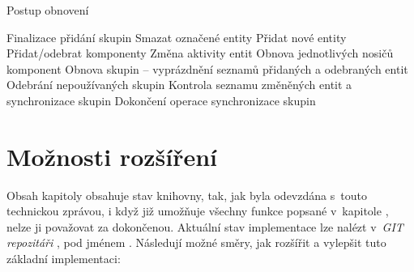 \begin{algorithm}
	\caption{Postup obnovení}
	\label{Alg:Refresh}
	
	\begin{algorithmic}[1]
		
			\EMBlockStart
				\State Finalizace přidání skupin
			\EMBlockEnd
			\ACBlockStart
				\State Smazat označené entity
				\State Přidat nové entity
				\State Přidat/odebrat komponenty
				\State Změna aktivity entit
			\ACBlockEnd
			\CMBlockStart
				\State Obnova jednotlivých nosičů komponent
			\CMBlockEnd
			\GMBlockStart
				\State Obnova skupin -- vyprázdnění seznamů přidaných a odebraných entit
				\State Odebrání nepoužívaných skupin
				\State Kontrola seznamu změněných entit a synchronizace skupin
				\State Dokončení operace synchronizace skupin
			\GMBlockEnd
		\EndFunction
	\end{algorithmic}
\end{algorithm}

\pagebreak
\section{Možnosti rozšíření}
\label{Chap:ExtensionOptions}

Obsah kapitoly  obsahuje stav knihovny, tak, jak byla odevzdána s~touto technickou zprávou, i když již umožňuje všechny funkce popsané v~kapitole , nelze ji považovat za dokončenou. Aktuální stav implementace lze nalézt v~\emph{GIT repozitáři} \cite{EntropyGit}, pod jménem . Následují možné směry, jak rozšířit a vylepšit tuto základní implementaci: 

